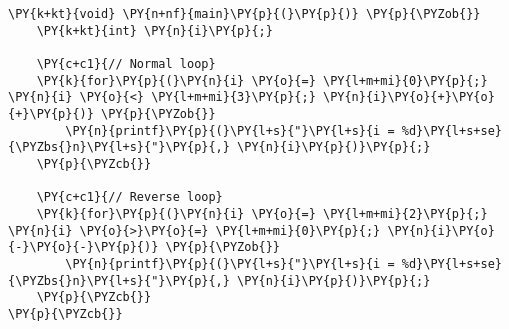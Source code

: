 \begin{Verbatim}[commandchars=\\\{\}]
\PY{k+kt}{void} \PY{n+nf}{main}\PY{p}{(}\PY{p}{)} \PY{p}{\PYZob{}}
    \PY{k+kt}{int} \PY{n}{i}\PY{p}{;}

    \PY{c+c1}{// Normal loop}
    \PY{k}{for}\PY{p}{(}\PY{n}{i} \PY{o}{=} \PY{l+m+mi}{0}\PY{p}{;} \PY{n}{i} \PY{o}{<} \PY{l+m+mi}{3}\PY{p}{;} \PY{n}{i}\PY{o}{+}\PY{o}{+}\PY{p}{)} \PY{p}{\PYZob{}}
        \PY{n}{printf}\PY{p}{(}\PY{l+s}{"}\PY{l+s}{i = %d}\PY{l+s+se}{\PYZbs{}n}\PY{l+s}{"}\PY{p}{,} \PY{n}{i}\PY{p}{)}\PY{p}{;}
    \PY{p}{\PYZcb{}}

    \PY{c+c1}{// Reverse loop}
    \PY{k}{for}\PY{p}{(}\PY{n}{i} \PY{o}{=} \PY{l+m+mi}{2}\PY{p}{;} \PY{n}{i} \PY{o}{>}\PY{o}{=} \PY{l+m+mi}{0}\PY{p}{;} \PY{n}{i}\PY{o}{-}\PY{o}{-}\PY{p}{)} \PY{p}{\PYZob{}}
        \PY{n}{printf}\PY{p}{(}\PY{l+s}{"}\PY{l+s}{i = %d}\PY{l+s+se}{\PYZbs{}n}\PY{l+s}{"}\PY{p}{,} \PY{n}{i}\PY{p}{)}\PY{p}{;}
    \PY{p}{\PYZcb{}}
\PY{p}{\PYZcb{}}
\end{Verbatim}
